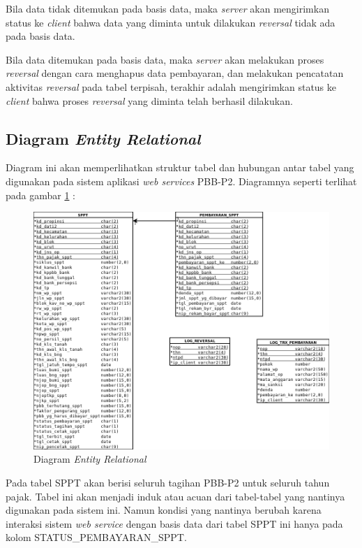 \documentclass[pdftex,12pt, oneside]{article}
\begin{document}
Bila data tidak ditemukan pada basis data, maka \textit{server} akan mengirimkan status ke \textit{client} bahwa data yang diminta untuk dilakukan \textit{reversal} tidak ada pada basis data.

Bila data ditemukan pada basis data, maka \textit{server} akan melakukan proses \textit{reversal} dengan cara menghapus data pembayaran, dan melakukan pencatatan aktivitas \textit{reversal} pada tabel terpisah, terakhir adalah mengirimkan status ke \textit{client} bahwa proses \textit{reversal} yang diminta telah berhasil dilakukan.

\subsection{Diagram \textit{Entity Relational}}

Diagram ini akan memperlihatkan struktur tabel dan hubungan antar tabel yang digunakan pada sistem aplikasi \textit{web services} PBB-P2. Diagramnya seperti terlihat pada gambar \ref{fig:uml-entity-relational} :

\begin{figure}[H]
  \centering
  \includegraphics[width=1\textwidth]{./resources/diagram/uml-entity-relational}
  \caption{Diagram \textit{Entity Relational}}
  \label{fig:uml-entity-relational}
\end{figure}

Pada tabel SPPT akan berisi seluruh tagihan PBB-P2 untuk seluruh tahun pajak. Tabel ini akan menjadi induk atau acuan dari tabel-tabel yang nantinya digunakan pada sistem ini. Namun kondisi yang nantinya berubah karena interaksi sistem \textit{web service} dengan basis data dari tabel SPPT ini hanya pada kolom STATUS\_PEMBAYARAN\_SPPT.
\end{document}
